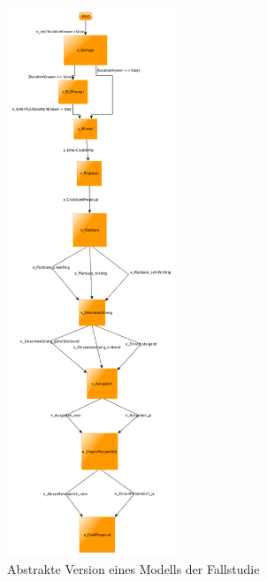 \begin{figure} 
  \centering
     \includegraphics[width=0.45\textwidth]{figures/modell_abstract.png}
  \caption{Abstrakte Version eines Modells der Fallstudie}
  \label{fig:modell_abstract}
\end{figure}

